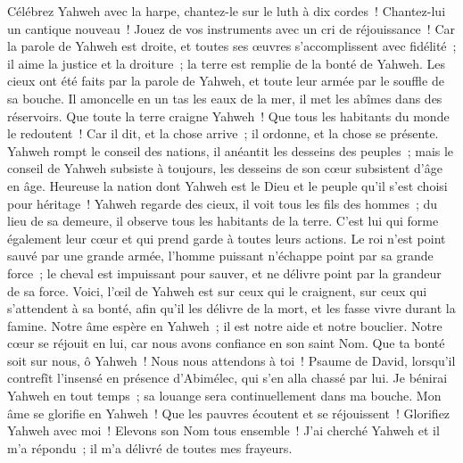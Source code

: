 \begin{multicols}{2}
Célébrez Yahweh avec la harpe, chantez-le sur le luth à dix cordes~!
Chantez-lui un cantique nouveau~! Jouez de vos instruments avec un cri de réjouissance~!
Car la parole de Yahweh est droite, et toutes ses œuvres s'accomplissent avec fidélité~;
il aime la justice et la droiture~; la terre est remplie de la bonté de Yahweh.
Les cieux ont été faits par la parole de Yahweh, et toute leur armée par le souffle de sa bouche.
Il amoncelle en un tas les eaux de la mer, il met les abîmes dans des réservoirs.
Que toute la terre craigne Yahweh~! Que tous les habitants du monde le redoutent~!
Car il dit, et la chose arrive~; il ordonne, et la chose se présente.
Yahweh rompt le conseil des nations, il anéantit les desseins des peuples~;
mais le conseil de Yahweh subsiste à toujours, les desseins de son cœur subsistent d'âge en âge.
Heureuse la nation dont Yahweh est le Dieu et le peuple qu'il s'est choisi pour héritage~!
Yahweh regarde des cieux, il voit tous les fils des hommes~;
du lieu de sa demeure, il observe tous les habitants de la terre.
C'est lui qui forme également leur cœur et qui prend garde à toutes leurs actions.
Le roi n'est point sauvé par une grande armée, l'homme puissant n'échappe point par sa grande force~;
le cheval est impuissant pour sauver, et ne délivre point par la grandeur de sa force.
Voici, l'œil de Yahweh est sur ceux qui le craignent, sur ceux qui s'attendent à sa bonté,
afin qu'il les délivre de la mort, et les fasse vivre durant la famine.
Notre âme espère en Yahweh~; il est notre aide et notre bouclier.
Notre cœur se réjouit en lui, car nous avons confiance en son saint Nom.
Que ta bonté soit sur nous, ô Yahweh~! Nous nous attendons à toi~!
\VerseOne{}Psaume de David, lorsqu'il contrefît l'insensé en présence d'Abimélec, qui s'en alla chassé par lui.
 Je bénirai Yahweh en tout temps~; sa louange sera continuellement dans ma bouche.
 Mon âme se glorifie en Yahweh~! Que les pauvres écoutent et se réjouissent~!
 Glorifiez Yahweh avec moi~! Elevons son Nom tous ensemble~!
 J'ai cherché Yahweh et il m'a répondu~; il m'a délivré de toutes mes frayeurs.

\end{multicols}
